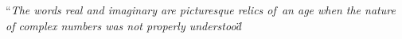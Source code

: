 \documentclass[preview]{standalone}
\begin{document}
\begin{center}
``\textit{The words real and imaginary are picturesque relics of\
        an age when the nature of complex numbers was not properly understood}\"
\end{center}
\end{document}
